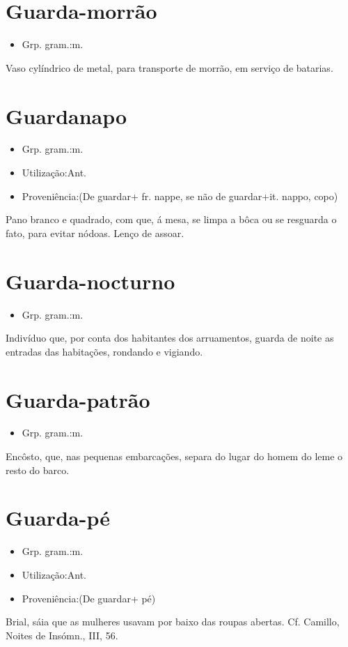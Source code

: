 \section{Guarda-morrão}
\begin{itemize}
\item {Grp. gram.:m.}
\end{itemize}
Vaso cylíndrico de metal, para transporte de morrão, em serviço de batarias.
\section{Guardanapo}
\begin{itemize}
\item {Grp. gram.:m.}
\end{itemize}
\begin{itemize}
\item {Utilização:Ant.}
\end{itemize}
\begin{itemize}
\item {Proveniência:(De \textunderscore guardar\textunderscore  + fr. \textunderscore nappe\textunderscore , se não de \textunderscore guardar\textunderscore  +it. \textunderscore nappo\textunderscore , copo)}
\end{itemize}
Pano branco e quadrado, com que, á mesa, se limpa a bôca ou se resguarda o fato, para evitar nódoas.
Lenço de assoar.
\section{Guarda-nocturno}
\begin{itemize}
\item {Grp. gram.:m.}
\end{itemize}
Indivíduo que, por conta dos habitantes dos arruamentos, guarda de noite as entradas das habitações, rondando e vigiando.
\section{Guarda-patrão}
\begin{itemize}
\item {Grp. gram.:m.}
\end{itemize}
Encôsto, que, nas pequenas embarcações, separa do lugar do homem do leme o resto do barco.
\section{Guarda-pé}
\begin{itemize}
\item {Grp. gram.:m.}
\end{itemize}
\begin{itemize}
\item {Utilização:Ant.}
\end{itemize}
\begin{itemize}
\item {Proveniência:(De \textunderscore guardar\textunderscore  + \textunderscore pé\textunderscore )}
\end{itemize}
Brial, sáia que as mulheres usavam por baixo das roupas abertas. Cf. Camillo, \textunderscore Noites de Insómn.\textunderscore , III, 56.
